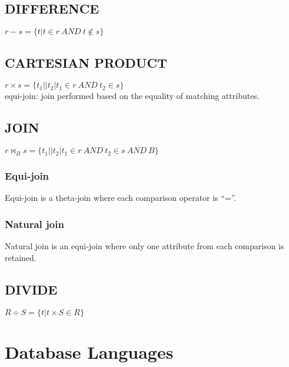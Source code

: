 \documentclass[a4paper]{scrartcl}
\newcommand{\set}[2]{\{#1|#2\}}
\begin{document}
  \subsection{DIFFERENCE}
    $r - s = \set{t}{t \in r~AND~ t \notin s}$
  \subsection{CARTESIAN PRODUCT}
    $r \times s = \set{t_1 || t_2}{t_1 \in r~AND~t_2 \in s}$\\
    equi-join: join performed based on the equality of matching attributes.
  \subsection{JOIN}
    $r \bowtie_B s = \set{t_1 || t_2}{t_1 \in r~AND~t_2 \in s ~AND~B}$\\
    \subsubsection{Equi-join}
      Equi-join is a theta-join where each comparison operator is “=”.
    \subsubsection{Natural join}
      Natural join is an equi-join where only one attribute from each comparison is retained.
  \subsection{DIVIDE}
    $R \div S = \set{t}{t \times S \in R}$
    
\section{Database Languages}
\end{document}
